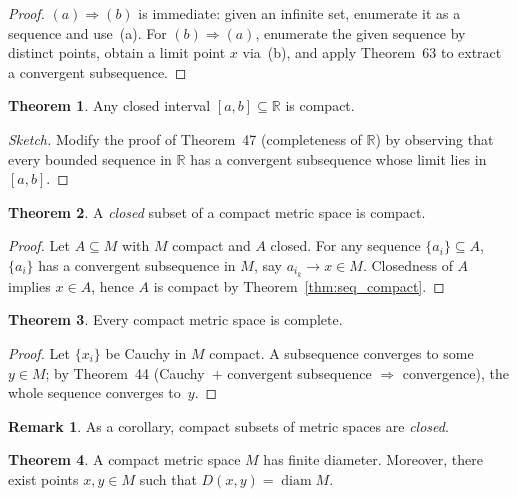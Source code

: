 \documentclass[12pt]{article}
\theoremstyle{definition} %
\newtheorem{theorem}{Theorem}
\newtheorem{remark}{Remark}
\theoremstyle{plain} %
\begin{document}
\begin{proof}
  $(a)\!\Rightarrow\!(b)$ is immediate:
  given an infinite set, enumerate it as a sequence and use~(a).
  For $(b)\!\Rightarrow\!(a)$, enumerate the given sequence by distinct
  points, obtain a limit point $x$ via~(b), and apply
  Theorem 63 to extract a convergent subsequence.
\end{proof}

\begin{theorem}\label{thm:closed_interval_compact}
  Any closed interval $[a,b]\subseteq\mathbb R$ is compact.
\end{theorem}

\begin{proof}[Sketch]
  Modify the proof of Theorem 47 (completeness of $\mathbb R$)
  by observing that every bounded sequence in $\mathbb R$ has a
  convergent subsequence whose limit lies in~$[a,b]$.
\end{proof}

\begin{theorem}\label{thm:closed_subset_compact}
  A \emph{closed} subset of a compact metric space is compact.
\end{theorem}

\begin{proof}
  Let $A\subseteq M$ with $M$ compact and $A$ closed.
  For any sequence $\{a_i\}\subseteq A$,
  $\{a_i\}$ has a convergent subsequence in $M$,
  say $a_{i_k}\to x\in M$.
  Closedness of $A$ implies $x\in A$,
  hence $A$ is compact by Theorem \ref{thm:seq_compact}.
\end{proof}

\begin{theorem}\label{thm:compact_complete}
  Every compact metric space is complete.
\end{theorem}

\begin{proof}
  Let $\{x_i\}$ be Cauchy in $M$ compact.
  A subsequence converges to some $y\in M$; by Theorem 44
  (Cauchy $+$ convergent subsequence $\Rightarrow$ convergence),
  the whole sequence converges to $y$.
\end{proof}

\begin{remark}
  As a corollary, compact subsets of metric spaces are \emph{closed}.
\end{remark}

\begin{theorem}\label{thm:finite_diameter}
  A compact metric space $M$ has finite diameter.
  Moreover, there exist points $x,y\in M$ such that
  $D(x,y)=\operatorname{diam}M$.
\end{theorem}
\end{document}
